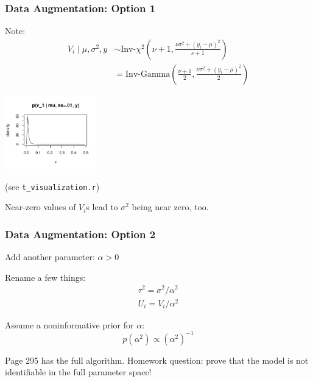 \documentclass{beamer}
\begin{document}
\begin{frame}[fragile]
\frametitle{Data Augmentation: Option 1}

Note:
\begin{align*}
V_i \mid \mu, \sigma^2, y &\sim \text{Inv-}\chi^2\left(\nu + 1, \frac{ \nu \sigma^2 + (y_i - \mu)^2 }{\nu+1 } \right) \\
&= \text{Inv-Gamma}\left(\frac{\nu+1}{2}, \frac{ \nu \sigma^2 + (y_i - \mu)^2 }{2 }\right)
\end{align*}

\begin{center}
\includegraphics[width=40mm]{cond_dens_vi}
\end{center}
(see \verb|t_visualization.r|)
\newline

Near-zero values of $V_i$s lead to $\sigma^2$ being near zero, too.


\end{frame}
\begin{frame}[fragile]
\frametitle{Data Augmentation: Option 2}

Add another parameter: $\alpha > 0$
\newline

Rename a few things:
\begin{gather}
\tau^2 = \sigma^2/\alpha^2 \\
U_i = V_i/\alpha^2 
\end{gather}

Assume a noninformative prior for $\alpha$: 
$$
p(\alpha^2) \propto (\alpha^2)^{-1}
$$

Page 295 has the full algorithm. Homework question: prove that the model is not identifiable in the full parameter space!

\end{frame}
\end{document}
